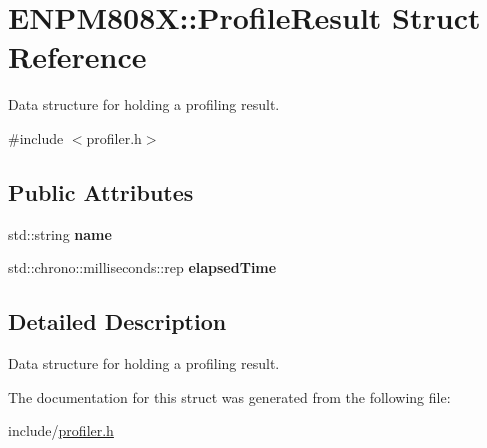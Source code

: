 \hypertarget{struct_e_n_p_m808_x_1_1_profile_result}{}\section{E\+N\+P\+M808X\+:\+:Profile\+Result Struct Reference}
\label{struct_e_n_p_m808_x_1_1_profile_result}


Data structure for holding a profiling result.  




{\ttfamily \#include $<$profiler.\+h$>$}

\subsection*{Public Attributes}
\begin{DoxyCompactItemize}
\item 
\mbox{\label{struct_e_n_p_m808_x_1_1_profile_result_a6aff91be06e3fc2ce80e39aa54379fe9}} 
std\+::string {\bfseries name}
\item 
\mbox{\label{struct_e_n_p_m808_x_1_1_profile_result_ab884b7076e66d8a4ea2fbc68e0f1fcff}} 
std\+::chrono\+::milliseconds\+::rep {\bfseries elapsed\+Time}
\end{DoxyCompactItemize}


\subsection{Detailed Description}
Data structure for holding a profiling result. 

The documentation for this struct was generated from the following file\+:\begin{DoxyCompactItemize}
\item 
include/\hyperlink{profiler_8h}{profiler.\+h}\end{DoxyCompactItemize}
